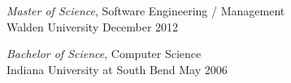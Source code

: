 \section{}
\vspace{8pt} %

{\sl Master of Science}, 
Software Engineering / Management \\ 
Walden University \hfill December 2012 
 
{\sl Bachelor of Science}, Computer Science \\ 
Indiana University at South Bend \hfill May 2006
